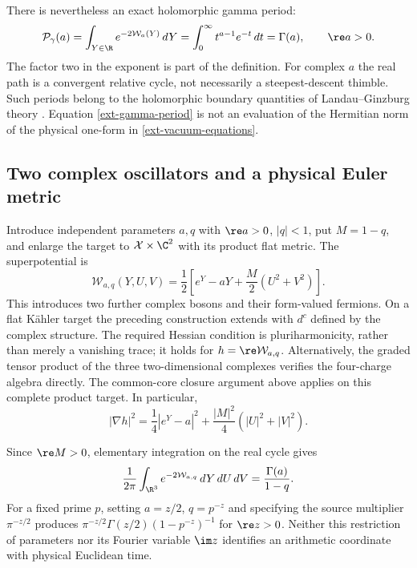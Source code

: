 There is nevertheless an exact holomorphic gamma period:
\begin{equation}
 \mathcal P_\gamma(a)
 =\int_{Y\in\R}e^{-2\mathcal W_a(Y)}\,dY
 =\int_0^\infty t^{a-1}e^{-t}\,dt
 =\Gamma(a),\qquad \re a>0.
 \label{ext-gamma-period}
\end{equation}
The factor two in the exponent is part of the definition.  For
complex $a$ the real path is a convergent relative cycle, not
necessarily a steepest-descent thimble.  Such periods belong to the
holomorphic boundary quantities of Landau--Ginzburg theory
\cite{CGV}.  Equation \eqref{ext-gamma-period} is not an evaluation
of the Hermitian norm of the physical one-form in
\eqref{ext-vacuum-equations}.

\subsection{Two complex oscillators and a physical Euler metric}
\label{ext-euler}

Introduce independent parameters $a,q$ with $\re a>0$, $|q|<1$,
put $M=1-q$, and enlarge the target to $\mathcal X\times\C^2$ with
its product flat metric.  The superpotential is
\begin{equation}
 \mathcal W_{a,q}(Y,U,V)
 =\frac12\left[e^Y-aY+\frac M2(U^2+V^2)\right].
 \label{ext-product-superpotential}
\end{equation}
This introduces two further complex bosons and their form-valued
fermions.  On a flat Kähler target the preceding construction extends
with $d^c$ defined by the complex structure.  The required Hessian
condition is pluriharmonicity, rather than merely a vanishing trace;
it holds for $h=\re\mathcal W_{a,q}$.  Alternatively, the graded
tensor product of the three two-dimensional complexes verifies the
four-charge algebra directly.  The common-core closure argument
above applies on this complete product target.  In particular,
\begin{equation}
 |\nabla h|^2=\frac14|e^Y-a|^2
               +\frac{|M|^2}{4}(|U|^2+|V|^2).
 \label{ext-product-potential}
\end{equation}

Since $\re M>0$, elementary integration on the real cycle gives
\begin{equation}
 \frac1{2\pi}\int_{\R^3}e^{-2\mathcal W_{a,q}}\,dY\,dU\,dV
 =\frac{\Gamma(a)}{1-q}.
 \label{ext-product-period}
\end{equation}
For a fixed prime $p$, setting $a=z/2$, $q=p^{-z}$ and specifying the
source multiplier $\pi^{-z/2}$ produces
$\pi^{-z/2}\Gamma(z/2)(1-p^{-z})^{-1}$ for $\re z>0$.
Neither this restriction of parameters nor its Fourier variable
$\im z$ identifies an arithmetic coordinate with physical Euclidean
time.

